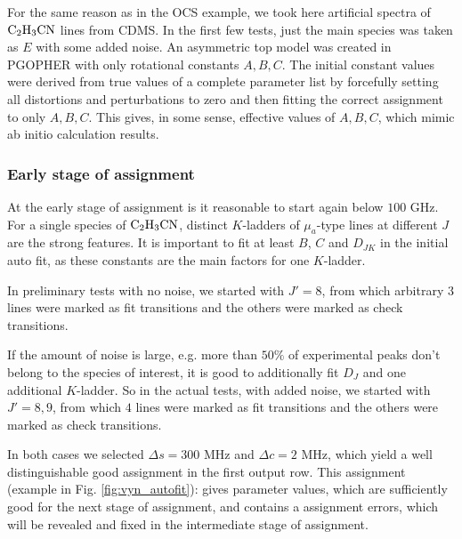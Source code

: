 \documentclass[11pt]{article}
\begin{document}
For the same reason as in the OCS example, we took here artificial spectra of $\rm C_2H_3CN$ lines from CDMS. In the first few tests, just the main species was taken as $E$ with some added noise. An asymmetric top model was created in PGOPHER with only rotational constants $A, B, C$. The initial constant values were derived from true values of a complete parameter list by forcefully setting all distortions and perturbations to zero and then fitting the correct assignment to only $A, B, C$. This gives, in some sense, effective values of $A, B, C$, which mimic ab initio calculation results. %

\subsubsection{Early stage of assignment}

At the early stage of assignment is it reasonable to start again below $100$ GHz. 
For a single species of $\rm C_2H_3CN$, 
distinct $K$-ladders of $\mu_a$-type lines at different $J$ are the strong features. %
It is important to fit at least $B$, $C$ and $D_{JK}$ in the initial auto fit, as these constants are the main factors for one $K$-ladder. 

In preliminary tests with no noise, we started with $J' = 8$, from which arbitrary $3$ lines were marked as fit transitions and the others were marked as check transitions. 

If the amount of noise is large, e.g. more than $50\%$ of  experimental peaks don't belong to the species of interest, it is good to additionally fit $D_J$ and one additional $K$-ladder. So in the actual tests, with added noise, we started with $J' = 8, 9$, from which $4$ lines were marked as fit transitions and the others were marked as check transitions.

In both cases we selected $\Delta s = 300$ MHz and $\Delta c = 2$ MHz, which yield a well distinguishable good assignment in the first output row. This assignment (example in Fig. \ref{fig:vyn_autofit}): gives parameter values, which are sufficiently good for the next stage of assignment, and contains a assignment errors, which will be  revealed and fixed in the intermediate stage of assignment. 
\end{document}
